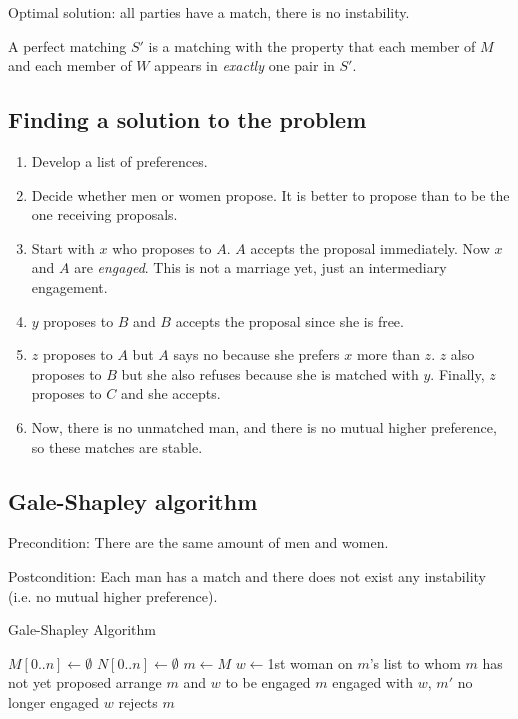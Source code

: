 \documentclass{article}
\begin{document}
Optimal solution: all parties have a match, there is no instability.

A perfect matching $S'$ is a matching with the property that each member of $M$ and each member of $W$ appears in \textit{exactly} one pair in $S'$.

\subsection{Finding a solution to the problem}
\begin{enumerate}
    \item Develop a list of preferences.
    \item Decide whether men or women propose. It is better to propose than to be the one receiving proposals.
    \item Start with $x$ who proposes to $A$. $A$ accepts the proposal immediately. Now $x$ and $A$ are \textit{engaged}. This is not a marriage yet, just an intermediary engagement.
    \item $y$ proposes to $B$ and $B$ accepts the proposal since she is free.
    \item $z$ proposes to $A$ but $A$ says no because she prefers $x$ more than $z$. $z$ also proposes to $B$ but she also refuses because she is matched with $y$. Finally, $z$ proposes to $C$ and she accepts.
    \item Now, there is no unmatched man, and there is no mutual higher preference, so these matches are stable.
\end{enumerate}

\subsection{Gale-Shapley algorithm}

Precondition: There are the same amount of men and women.

Postcondition: Each man has a match and there does not exist any instability (i.e. no mutual higher preference).

\begin{algorithm}
\caption{Gale-Shapley Algorithm}\label{galeShapley}
\begin{algorithmic}[1]
    \State $M[0..n] \gets \emptyset$
    \State $N[0..n] \gets \emptyset$
        \State $m \gets M$ 
        \State $w \gets $1st woman on $m$'s list to whom $m$ has not yet proposed
            \State arrange $m$ and $w$ to be engaged
            \State $m$ engaged with $w$, $m'$ no longer engaged
        \Else
            \State $w$ rejects $m$
        \EndIf
    \EndWhile
\EndProcedure
\end{algorithmic}
\end{algorithm}
\end{document}
